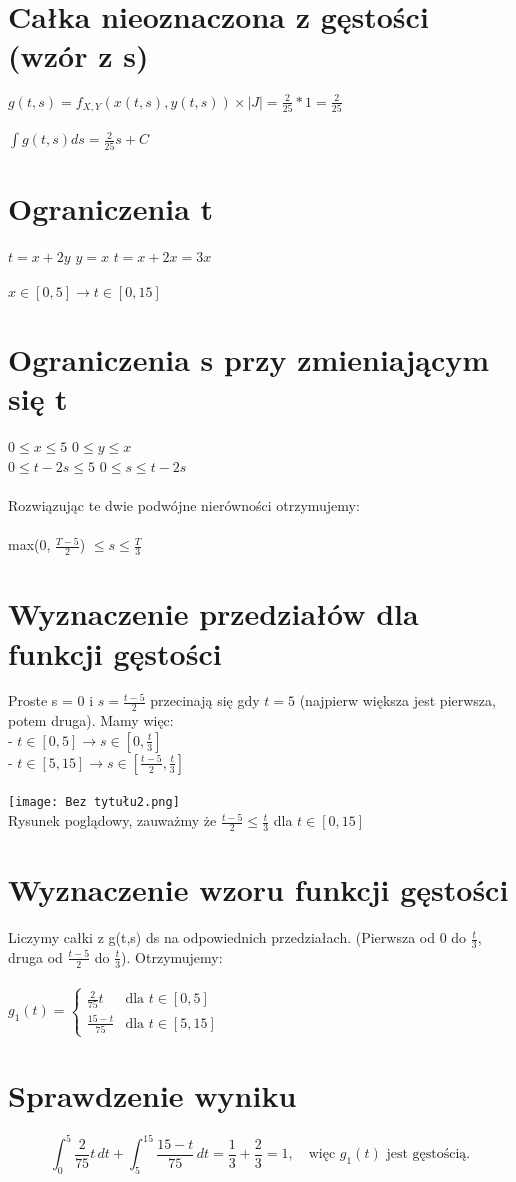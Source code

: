 \documentclass{article}
\begin{document}
\pagebreak
\onehalfspacing

\section{Całka nieoznaczona z gęstości (wzór z s)}
$g(t,s) = f_{X,Y}(x(t,s), y(t,s)) \times |J| = \frac{2}{25} * 1 = \frac{2}{25}$\\\\
$\int g(t,s) ds = \frac{2}{25} s + C$

\section{Ograniczenia t}
$t = x + 2y$ \quad \quad \quad $y = x$ \quad \quad \quad $t = x + 2x = 3x$\\\\
$x \in [0,5] \rightarrow t \in [0, 15]$

\section{Ograniczenia s przy zmieniającym się t}
$0 \leq x \leq 5$ \quad \quad \quad \quad $0 \leq y \leq x$\\
$0 \leq t-2s \leq 5$ \quad \quad $0 \leq s \leq t-2s$\\\\
Rozwiązując te dwie podwójne nierówności otrzymujemy:\\\\
max(0, $\frac{T-5}{2}$) $\leq s \leq \frac{T}{3}$

\section{Wyznaczenie przedziałów dla funkcji gęstości}
Proste s = 0 i $s = \frac{t-5}{2}$ przecinają się gdy $t = 5$ (najpierw większa
jest pierwsza, potem druga). Mamy więc:\\ - $t \in [0,5] \rightarrow s \in [0,
        \frac{t}{3}]$\\ - $t \in [5, 15] \rightarrow s \in [\frac{t-5}{2},
        \frac{t}{3}]$\\ \noindent \\ \texttt{[image: Bez
    tytułu2.png]}\\ Rysunek poglądowy, zauważmy że $\frac{t-5}{2} \leq \frac{t}{3}$
dla $t \in [0, 15]$

\section{Wyznaczenie wzoru funkcji gęstości}
Liczymy całki z g(t,s) ds na odpowiednich przedziałach. (Pierwsza od 0 do
$\frac{t}{3}$, druga od $\frac{t-5}{2}$ do $\frac{t}{3}$). Otrzymujemy:\\\\ $
    g_1(t) =
    \begin{cases}
        \frac{2}{75}t     & \text{dla } t \in [0,5]  \\[10pt]
        \frac{15 - t}{75} & \text{dla } t \in [5,15]
    \end{cases}
$

\section{Sprawdzenie wyniku}
\noindent

$$
    \int_0^5 \frac{2}{75}t \, dt + \int_5^{15} \frac{15-t}{75} \, dt = \frac{1}{3} + \frac{2}{3} = 1,
    \quad \text{więc } g_1(t) \text{ jest gęstością.}
$$
\end{document}
